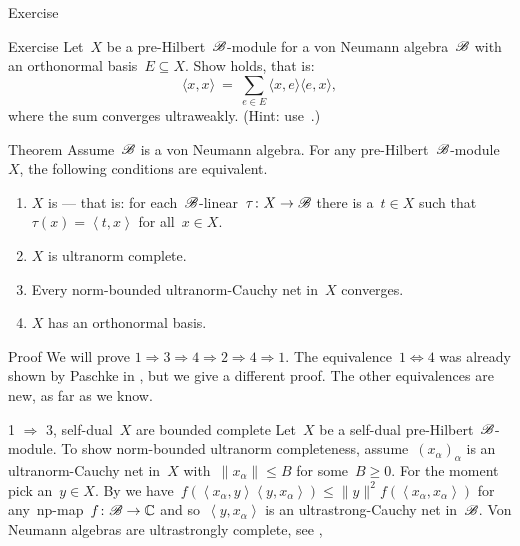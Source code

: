 \begin{parsec}
\begin{point}{Exercise}
\end{point}
\begin{point}{Exercise}
Let~$X$ be a pre-Hilbert~$\mathscr{B}$-module for a von Neumann algebra~$\mathscr{B}$
    with an orthonormal basis~$E \subseteq X$.
    Show  holds, that is:
\begin{equation*}
    \langle x, x \rangle \ =\ 
    \sum_{e \in E} \langle x, e\rangle \langle e, x\rangle,
\end{equation*}
where the sum converges ultraweakly.
(Hint: use~.)
\end{point}
\begin{point}[dils-selfdual]{Theorem}%
    Assume~$\mathscr{B}$ is a von Neumann algebra.
    For any pre-Hilbert~$\mathscr{B}$-module~$X$,
        the following conditions are equivalent.
        \begin{enumerate}
            \item $X$ is  ---
                that is: for each~$\mathscr{B}$-linear~$\tau\colon X \to \mathscr{B}$
                there is a~$t \in X$ such that~$\tau(x) = \left<t,x\right>$
                    for all~$x \in X$.
            \item $X$ is ultranorm complete.
            \item Every norm-bounded ultranorm-Cauchy net in~$X$ converges.
            \item $X$ has an orthonormal basis.
        \end{enumerate}
\begin{point}{Proof}%
We will prove $1 \Rightarrow 3 \Rightarrow 4 \Rightarrow 2 \Rightarrow 4 \Rightarrow 1$.
The equivalence~$1 \Leftrightarrow 4$
    was already shown by Paschke in \cite[Thm.~3.12]{paschke},
    but we give a different proof. The other equivalences are new,
    as far as we know.
\begin{point}{1 $\Rightarrow$ 3, self-dual~$X$ are bounded complete}%
    Let~$X$ be a self-dual pre-Hilbert~$\mathscr{B}$-module.
    To show norm-bounded ultranorm completeness,
     assume~$(x_\alpha)_\alpha$ is an ultranorm-Cauchy net in~$X$
        with~$\|x_\alpha\| \leq B$ for some~$B \geq 0$.
     For the moment pick an~$y \in X$.
By  we
    have~$f(\left<x_\alpha,y\right>\left<y,x_\alpha\right>) \leq \|y\|^2
        f(\left<x_\alpha,x_\alpha\right>)$ for any~np-map~$f\colon \mathscr{B} \to \mathbb{C}$
        and so~$\left<y,x_\alpha\right>$ is an ultrastrong-Cauchy net in~$\mathscr{B}$.
Von Neumann algebras are ultrastrongly complete, see \sref{vn-complete},

\end{point}
\end{point}
\end{point}
\end{parsec}
